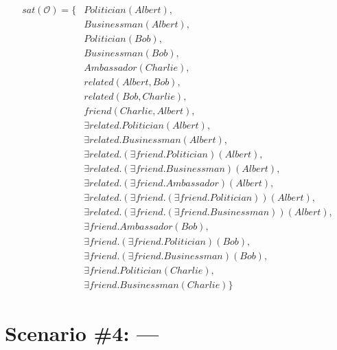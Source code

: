 \begin{equation*}
    \begin{aligned}
        sat(\mathcal{O}) = \{ & Politician(Albert),      \\
                              & Businessman(Albert),     \\
                              & Politician(Bob),         \\
                              & Businessman(Bob),        \\
                              & Ambassador(Charlie),     \\
                              & related(Albert, Bob),    \\
                              & related(Bob, Charlie),   \\ 
                              & friend(Charlie, Albert), \\
                              & \exists related.Politician(Albert),  \\
                              & \exists related.Businessman(Albert), \\
                              & \exists related.(\exists friend.Politician)(Albert),  \\
                              & \exists related.(\exists friend.Businessman)(Albert), \\
                              & \exists related.(\exists friend.Ambassador)(Albert),  \\
                              & \exists related.(\exists friend.(\exists friend.Politician))(Albert),  \\
                              & \exists related.(\exists friend.(\exists friend.Businessman))(Albert), \\
                              & \exists friend.Ambassador(Bob), \\
                              & \exists friend.(\exists friend.Politician)(Bob),  \\
                              & \exists friend.(\exists friend.Businessman)(Bob), \\
                              & \exists friend.Politician(Charlie), \\
                              & \exists friend.Businessman(Charlie) \} 
    \end{aligned}
\end{equation*}

\section{Scenario \#4: ---}
\label{sec:scenario-4}

